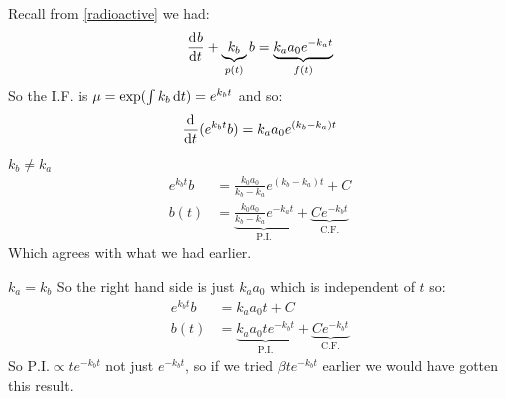 \documentclass[../main.tex]{subfiles}
\begin{document}
\begin{example}
  Recall from \cref{radioactive} we had:
  \[
    \deriv{b}{t} + \underbrace{k_b}_{p(t)}b = \underbrace{k_a a_0 e^{-k_a t}}_{f(t)}
  \]
  So the I.F. is $\mu = \exp(\int k_b \,\mathrm{d} t) = e^{k_b t}$ and so:
  \[
    \deriv{}{t}(e^{k_b t}b) = k_a a_0 e^{(k_b - k_a)t}
  \]
  \begin{proofcases}
    \begin{case}{$k_b \neq k_a$}
      \begin{align*}
        e^{k_b t}b &= \frac{k_0 a_0}{k_b - k_a}e^{(k_b - k_a)t} +C \\
              b(t) &= \underbrace{\frac{k_0 a_0}{k_b - k_a}e^{-k_a t}}_{\text{P.I.}} + \underbrace{Ce^{-k_b t}}_{\text{C.F.}}
      \end{align*}
      Which agrees with what we had earlier.
    \end{case}
    \label{differentPI}
    \begin{case}{$k_a = k_b$}
      So the right hand side is just $k_a a_0$ which is independent of $t$ so:
      \begin{align*}
        e^{k_b t}b &= k_a a_0 t + C \\
        b(t) &= \underbrace{k_a a_0 t e^{-k_b t}}_{\text{P.I.}} + \underbrace{Ce^{-k_b t}}_{\text{C.F.}}
      \end{align*}
      So $\text{P.I.} \propto t e^{-k_b t}$ not just $e^{-k_b t}$, so if we tried $\beta t e^{-k_b t}$ earlier we would have gotten this result.
      \begin{center}
      \end{center}
    \end{case}
  \end{proofcases}
\end{example}
\end{document}
